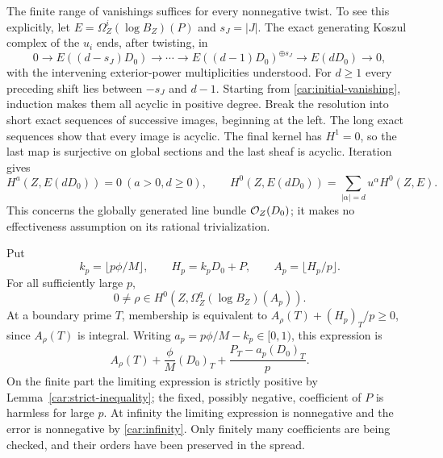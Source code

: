The finite range of vanishings suffices for every nonnegative
twist. To see this explicitly, let
$E=\Omega_Z^i(\log B_Z)(P)$ and $s_J=|J|$. The exact generating
Koszul complex of the $u_i$ ends, after twisting, in
\[
 0\longrightarrow E((d-s_J)D_0)\longrightarrow\cdots
 \longrightarrow E((d-1)D_0)^{\oplus s_J}
 \longrightarrow E(dD_0)\longrightarrow0,
\]
with the intervening exterior-power multiplicities understood.
For $d\ge1$ every preceding shift lies between $-s_J$ and $d-1$.
Starting from \eqref{car:initial-vanishing}, induction makes them
all acyclic in positive degree. Break the resolution into short
exact sequences of successive images, beginning at the left.
The long exact sequences show that every image is acyclic.
The final kernel has $H^1=0$, so the last map is surjective on
global sections and the last sheaf is acyclic. Iteration gives
\begin{equation}\label{car:koszul-generation}
 H^a(Z,E(dD_0))=0\ (a>0,d\ge0),\qquad
 H^0(Z,E(dD_0))=\sum_{|\alpha|=d}u^\alpha H^0(Z,E).
\end{equation}
This concerns the globally generated line bundle
$\mathcal O_Z(D_0)$; it makes no effectiveness assumption on its rational
trivialization.

Put
\begin{equation}\label{car:Hp}
 k_p=\lfloor p\phi/M\rfloor,\qquad H_p=k_pD_0+P,
 \qquad A_p=\lfloor H_p/p\rfloor.
\end{equation}
For all sufficiently large $p$,
\begin{equation}\label{car:rho-section}
 0\ne\rho\in H^0(Z,\Omega_Z^q(\log B_Z)(A_p)).
\end{equation}
At a boundary prime $T$, membership is equivalent to
$A_\rho(T)+(H_p)_T/p\ge0$, since $A_\rho(T)$ is integral.
Writing $a_p=p\phi/M-k_p\in[0,1)$, this expression is
\[
 A_\rho(T)+\frac\phi M(D_0)_T
       +\frac{P_T-a_p(D_0)_T}{p}.
\]
On the finite part the limiting expression is strictly positive
by Lemma~\ref{car:strict-inequality}; the fixed, possibly negative,
coefficient of $P$ is harmless for large $p$. At infinity the
limiting expression is nonnegative and the error is nonnegative
by \eqref{car:infinity}. Only finitely many coefficients are being
checked, and their orders have been preserved in the spread.

